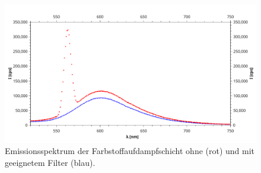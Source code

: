 	\begin{figure}
		\centering
		\includegraphics[width=\linewidth]{pic/flouromax_filter}
		\caption{Emissionsspektrum der Farbstoffaufdampfschicht ohne (rot) und mit geeignetem Filter (blau).}
		\label{fig:flouromax_filter}
	\end{figure}